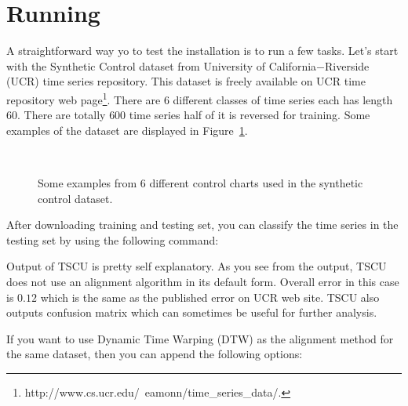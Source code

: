 \documentclass{article}
\newcommand{\matlabfile}[1]{}
\begin{document}
\section{Running}
A straightforward way yo to test the installation is to run a few tasks. Let's start with the Synthetic Control dataset from University of California$-$Riverside (UCR) time series repository. This dataset is freely available on UCR time repository web page\footnote{http://www.cs.ucr.edu/~eamonn/time\_series\_data/.}. There are $6$ different classes of time series each has length $60$. There are totally $600$ time series half of it is reversed for training. Some examples of the dataset are displayed in Figure~\ref{fig_synthetic}.

	\begin{figure}[!h]
	\centering%
	\\%
	\caption{Some examples from 6 different control charts used in the synthetic control dataset.}
	\label{fig_synthetic}
	\end{figure}

After downloading training and testing set, you can classify the time series in the testing set by using the following command:

\begin{scriptsize}
\matlabfile{tscu_manual_verbatim01.out}
\end{scriptsize}

Output of TSCU is pretty self explanatory.  As you see from the output, TSCU does not use an alignment algorithm in its default form. Overall error in this case is $0.12$ which is the same as the published error on UCR web site. TSCU also outputs confusion matrix which can sometimes be useful for further analysis.

If you want to use Dynamic Time Warping (DTW) as the alignment method for the same dataset, then you can append the following options:
\begin{scriptsize}
\matlabfile{tscu_manual_verbatim02.out}
\end{scriptsize}
\end{document}
